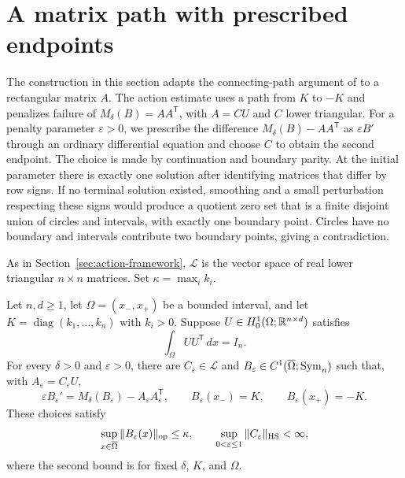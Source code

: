 \section{A matrix path with prescribed endpoints}
\label{sec:paths}

The construction in this section adapts the connecting-path argument of
\cite[Proposition~5.1]{ScalarCompanion} to a rectangular matrix $A$.
The action estimate uses a path from $K$ to $-K$ and penalizes failure
of $M_\delta(B)=AA^{\mathsf T}$, with $A=CU$ and $C$ lower triangular.
For a penalty parameter $\varepsilon>0$, we prescribe the difference
$M_\delta(B)-AA^{\mathsf T}$ as $\varepsilon B'$ through an ordinary
differential equation and choose $C$ to obtain the second endpoint.
The choice is made by continuation and boundary parity.
At the initial parameter there is exactly one solution after identifying
matrices that differ by row signs.  If no terminal solution existed,
smoothing and a small perturbation respecting these signs would produce
a quotient zero set that is a finite disjoint union of circles and
intervals, with exactly one boundary point.  Circles have no boundary
and intervals contribute two boundary points, giving a contradiction.

As in Section~\ref{sec:action-framework}, $\mathcal L$ is the vector
space of real lower triangular $n\times n$ matrices.  Set
$\kappa=\max_i k_i$.

\begin{proposition}
\label{prop:paths}
Let $n,d\geq1$, let $\Omega=(x_-,x_+)$ be a bounded interval, and let
$K=\operatorname{diag}(k_1,\ldots,k_n)$ with $k_i>0$.  Suppose
$U\in H^1_0(\Omega;\mathbb R^{n\times d})$ satisfies
\[
    \int_\Omega UU^{\mathsf T}\,dx=I_n.
\]
For every $\delta>0$ and $\varepsilon>0$, there are
$C_\varepsilon\in\mathcal L$ and
$B_\varepsilon\in C^1(\overline\Omega;\operatorname{Sym}_n)$ such that, with
$A_\varepsilon=C_\varepsilon U$,
\begin{equation}
\label{eq:path-ode}
    \varepsilon B_\varepsilon'
       =M_\delta(B_\varepsilon)-A_\varepsilon A_\varepsilon^{\mathsf T},
    \qquad
    B_\varepsilon(x_-)=K,
    \qquad B_\varepsilon(x_+)=-K.
\end{equation}
These choices satisfy
\begin{equation}
\label{eq:path-bounds}
    \sup_{x\in\overline\Omega}\|B_\varepsilon(x)\|_{\mathrm{op}}
       \leq\kappa,
    \qquad
    \sup_{0<\varepsilon\leq1}\|C_\varepsilon\|_{\mathrm{HS}}<\infty,
\end{equation}
where the second bound is for fixed $\delta$, $K$, and $\Omega$.
\end{proposition}

